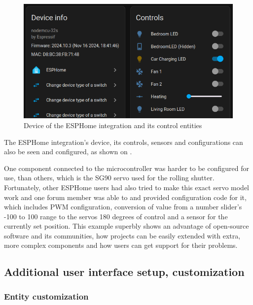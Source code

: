 \begin{figure}[!ht]
  \centering
  \includegraphics[width=150mm, keepaspectratio]{figures/esphome_controls.png}
  \caption{Device of the ESPHome integration and its control entities}
  \label{fig:HAesphomeControls}
\end{figure}

The ESPHome integration's device, its controls, sensors and configurations can also be seen and configured, as shown on .

One component connected to the microcontroller was harder to be configured for use, than others, which is the SG90 servo used for the rolling shutter. Fortunately, other ESPHome users had also tried to make this exact servo model work and one forum member was able to and provided configuration code for it, which includes PWM configuration, conversion of value from a number slider's -100 to 100 range to the servos 180 degrees of control and a sensor for the currently set position. \cite{ESPHomeForumSG90} This example superbly shows an advantage of open-source software and its communities, how projects can be easily extended with extra, more complex components and how users can get support for their problems.

\subsection{Additional user interface setup, customization}

\subsubsection{Entity customization}

